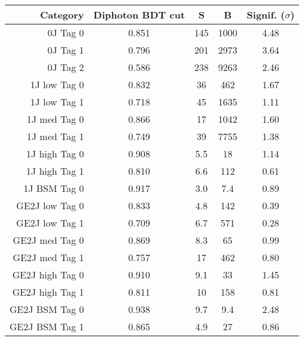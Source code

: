 \begin{tabular}{ r | c | c | c | c } 
\hline 
Category         & Diphoton BDT cut & S      & B          & Signif. ($\sigma$) \\
\hline 
0J Tag 0         & 0.851            & 145    & 1000       & 4.48                    \\
0J Tag 1         & 0.796            & 201    & 2973       & 3.64                    \\
0J Tag 2         & 0.586            & 238    & 9263       & 2.46                    \\
\hline           
1J low  Tag 0    & 0.832            & 36     & 462        & 1.67                    \\
1J low  Tag 1    & 0.718            & 45     & 1635       & 1.11                    \\
1J med  Tag 0    & 0.866            & 17     & 1042       & 1.60                    \\
1J med  Tag 1    & 0.749            & 39     & 7755       & 1.38                    \\
1J high Tag 0    & 0.908            & 5.5    & 18         & 1.14                    \\
1J high Tag 1    & 0.810            & 6.6    & 112        & 0.61                    \\
1J BSM  Tag 0    & 0.917            & 3.0    & 7.4        & 0.89                    \\
\hline           
GE2J low  Tag 0  & 0.833            & 4.8    & 142        & 0.39                    \\
GE2J low  Tag 1  & 0.709            & 6.7    & 571        & 0.28                    \\
GE2J med  Tag 0  & 0.869            & 8.3    & 65         & 0.99                    \\
GE2J med  Tag 1  & 0.757            & 17     & 462        & 0.80                    \\
GE2J high Tag 0  & 0.910            & 9.1    & 33         & 1.45                    \\
GE2J high Tag 1  & 0.811            & 10     & 158        & 0.81                    \\
GE2J BSM  Tag 0  & 0.938            & 9.7    & 9.4        & 2.48                    \\
GE2J BSM  Tag 1  & 0.865            & 4.9    & 27         & 0.86                    \\
\hline 
\end{tabular}
